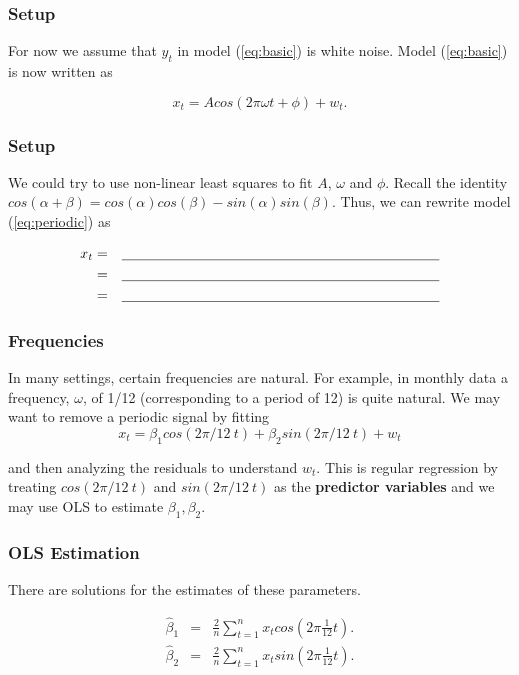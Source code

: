 \documentclass[%
xcolor=pdftex]{beamer}
\begin{document}
\begin{frame}
\frametitle{Setup}

For now we assume that $y_t$ in model (\ref{eq:basic}) is white noise.  Model (\ref{eq:basic}) is now written as

\begin{equation} \label{eq:periodic}
x_t=A cos( 2 \pi \omega t + \phi)+w_t.
\end{equation}

\end{frame}

\begin{frame}
\frametitle{Setup}

We could try to use non-linear least squares to fit $A$,
$\omega$ and $\phi$. Recall
the identity $cos(\alpha+\beta)=cos(\alpha)cos(\beta) -
sin(\alpha)sin(\beta)$. Thus, we can rewrite model (\ref{eq:periodic}) as

\begin{eqnarray}
x_t &=&  \underline{\hspace{80 mm}} \nonumber \\
    &=&  \underline{\hspace{80 mm}} \nonumber \\
    &=&  \underline{\hspace{80 mm}}
\end{eqnarray}

\end{frame}

\begin{frame}
\frametitle{Frequencies}

In many settings, certain frequencies are natural.  For example, in monthly data a frequency,  $\omega$, of 1/12 (corresponding to a period of 12) is quite natural.  We may want to remove a periodic signal by fitting
$$
x_t= \beta_1 cos( 2 \pi /12 \  t )+\beta_2 sin( 2 \pi /12 \  t )+w_t
$$

and then analyzing the residuals to understand $w_t$. This is regular regression by treating $cos(2\pi/12 \ t)$ and $sin( 2 \pi /12 \  t )$ as the \textbf{predictor variables} and we may use
OLS to estimate $\beta_1, \beta_2$.

\end{frame}

\begin{frame}
\frametitle{OLS Estimation}

There are solutions for the estimates of these
parameters.

\begin{eqnarray*}
\hat{\beta}_1 &=& \frac{2}{n} \sum_{t=1}^n x_t cos( 2 \pi \frac{1}{12} t ).\\
\hat{\beta}_2 &=& \frac{2}{n} \sum_{t=1}^n x_t sin( 2 \pi \frac{1}{12} t ).
\end{eqnarray*}

\end{frame}
\end{document}
